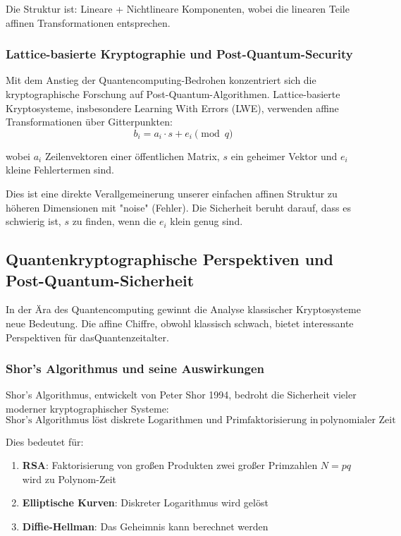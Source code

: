﻿\documentclass[12pt,a4paper]{article}
\begin{document}
	Die Struktur ist: Lineare + Nichtlineare Komponenten, wobei die linearen Teile affinen Transformationen entsprechen.
	
	\subsubsection{Lattice-basierte Kryptographie und Post-Quantum-Security}
	
	Mit dem Anstieg der Quantencomputing-Bedrohen konzentriert sich die kryptographische Forschung auf Post-Quantum-Algorithmen. Lattice-basierte Kryptosysteme, insbesondere Learning With Errors (LWE), verwenden affine Transformationen über Gitterpunkten:
	\begin{equation}
		b_i = a_i \cdot s + e_i \pmod{q}
	\end{equation}
	
	wobei $a_i$ Zeilenvektoren einer öffentlichen Matrix, $s$ ein geheimer Vektor und $e_i$ kleine Fehlertermen sind.
	
	Dies ist eine direkte Verallgemeinerung unserer einfachen affinen Struktur zu höheren Dimensionen mit "noise" (Fehler). Die Sicherheit beruht darauf, dass es schwierig ist, $s$ zu finden, wenn die $e_i$ klein genug sind.
	
	
	\subsection{Quantenkryptographische Perspektiven und Post-Quantum-Sicherheit}
	
	In der Ära des Quantencomputing gewinnt die Analyse klassischer Kryptosysteme neue Bedeutung. Die affine Chiffre, obwohl klassisch schwach, bietet interessante Perspektiven für dasQuantenzeitalter.
	
	\subsubsection{Shor's Algorithmus und seine Auswirkungen}
	
	Shor's Algorithmus, entwickelt von Peter Shor 1994, bedroht die Sicherheit vieler moderner kryptographischer Systeme:
	\begin{equation}
		\text{Shor's Algorithmus löst diskrete Logarithmen und Primfaktorisierung in} \, \text{polynomialer Zeit}
	\end{equation}
	
	Dies bedeutet für:
	\begin{enumerate}
		\item \textbf{RSA}: Faktorisierung von großen Produkten zwei großer Primzahlen $N = pq$ wird zu Polynom-Zeit
		\item \textbf{Elliptische Kurven}: Diskreter Logarithmus wird gelöst
		\item \textbf{Diffie-Hellman}: Das Geheimnis kann berechnet werden
	\end{enumerate}
	
\end{document}
